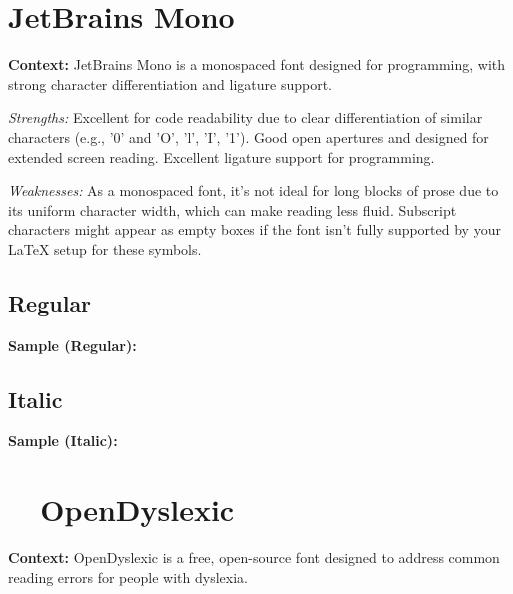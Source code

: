 \pagebreak
\hypertarget{trouble10}{}\section[JetBrains Mono]{JetBrains Mono \supercite{JetBrainsMono}}\label{app5:trouble10}
\noindent
\textbf{Context:} JetBrains Mono is a monospaced font designed for programming, with strong character differentiation and ligature support.

\begin{raggedright}
	\emph{Strengths:} Excellent for code readability due to clear differentiation of similar characters (e.g., '0' and 'O', 'l', 'I', '1'). Good open apertures and designed for extended screen reading. Excellent ligature support for programming.

	\emph{Weaknesses:} As a monospaced font, it's not ideal for long blocks of prose due to its uniform character width, which can make reading less fluid. Subscript characters might appear as empty boxes if the font isn't fully supported by your LaTeX setup for these symbols.

	\subsection{Regular}
	\noindent\textbf{Sample (Regular):}
	\FontSample{\jetbrainsmonofont}

	\subsection{Italic}
	\noindent\textbf{Sample (Italic):}
	\FontSample{{\jetbrainsmonofont\itshape}}
\end{raggedright}




\pagebreak
\section{~~OpenDyslexic}\label{app5:sec:opendyslexic}
\noindent
\textbf{Context:} OpenDyslexic is a free, open-source font designed to address common reading errors for people with dyslexia.

